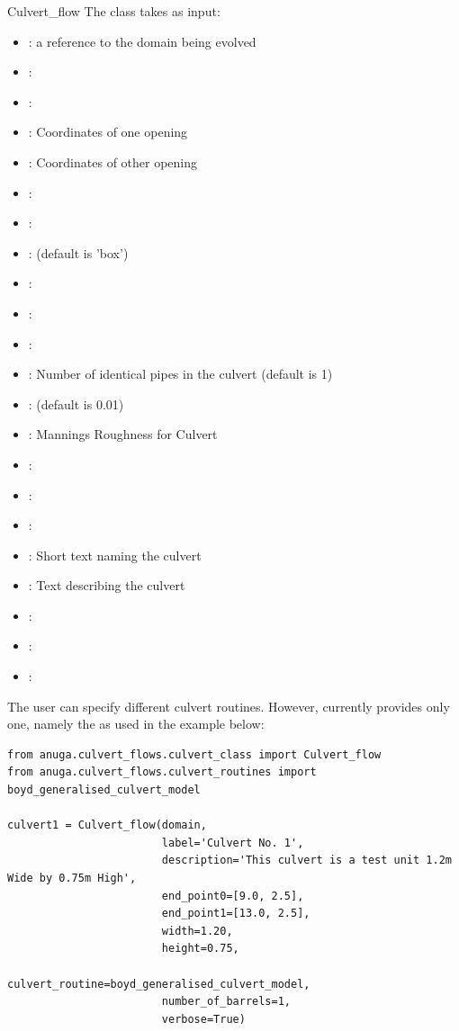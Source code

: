 \documentclass{manual}
\begin{document}
\begin{classdesc}{Culvert_flow}
The  class takes as input:
\begin{itemize}
  \item {}: a reference to the domain being evolved
  \item {}:
  \item {}:
  \item {}: Coordinates of one opening
  \item {}: Coordinates of other opening
  \item {}:
  \item {}:
  \item {}: (default is 'box')
  \item {}:
  \item {}:
  \item {}:
  \item {}: Number of identical pipes in the culvert (default is 1)
  \item {}: (default is 0.01)
  \item {}: Mannings Roughness for Culvert
  \item {}:
  \item {}:
  \item {}:
  \item {}: Short text naming the culvert
  \item {}: Text describing the culvert
  \item {}:
  \item {}:
  \item {}:
\end{itemize}

The user can specify different culvert routines. However, \anuga currently provides only one, namely the
 as used in the example below:

\begin{verbatim}
from anuga.culvert_flows.culvert_class import Culvert_flow
from anuga.culvert_flows.culvert_routines import boyd_generalised_culvert_model

culvert1 = Culvert_flow(domain,
                        label='Culvert No. 1',
                        description='This culvert is a test unit 1.2m Wide by 0.75m High',
                        end_point0=[9.0, 2.5],
                        end_point1=[13.0, 2.5],
                        width=1.20,
                        height=0.75,
                        culvert_routine=boyd_generalised_culvert_model,
                        number_of_barrels=1,
                        verbose=True)


\end{verbatim}
\end{classdesc}
\end{document}
